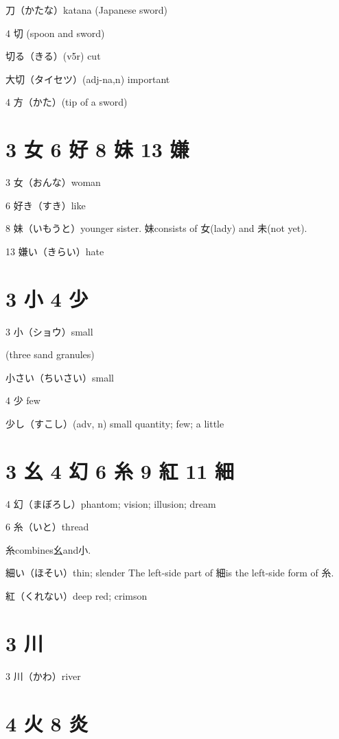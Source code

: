 刀（かたな）katana (Japanese sword)

4 切 (spoon and sword)

切る（きる）(v5r) cut

大切（タイセツ）(adj-na,n) important

4 方（かた）(tip of a sword)





\section{3 女 6 好 8 妹 13 嫌}

3 女（おんな）woman

6 好き（すき）like

8 妹（いもうと）younger sister.
妹consists of 女(lady) and 未(not yet).

13 嫌い（きらい）hate

\section{3 小 4 少}

3 小（ショウ）small

(three sand granules)

小さい（ちいさい）small

4 少 few

少し（すこし）(adv, n) small quantity; few; a little

\section{3 幺 4 幻 6 糸 9 紅 11 細}

4 幻（まぼろし）phantom; vision; illusion; dream

6 糸（いと）thread

糸combines幺and小.

細い（ほそい）thin; slender
The left-side part of 細is the left-side form of 糸.

紅（くれない）deep red; crimson

\section{3 川}

3 川（かわ）river






\section{4 火 8 炎}

